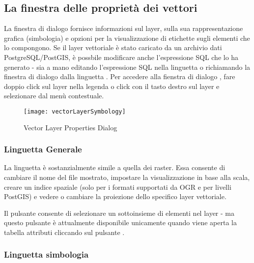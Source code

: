 \subsection{La finestra delle proprietà dei vettori}\label{sec:vectorprops}

La finestra di dialogo  fornisce informazioni
sul layer, sulla sua rappresentazione grafica (simbologia) e opzioni per la
visualizzazione di etichette sugli elementi che lo compongono. Se il layer
vettoriale è stato caricato da un archivio dati PostgreSQL/PostGIS, è possbile
modificare anche l'espressione SQL che lo ha generato - sia a mano editando
l'espressione SQL nella linguetta  o richiamando la finestra di
dialogo  dalla linguetta . 
Per accedere alla fienstra di dialogo , fare
doppio click sul layer nella legenda o click con il tasto destro  sul layer e
selezionare  dal menù contestuale.

\begin{figure}[H]
   \begin{center}
   \caption{Vector Layer Properties Dialog \nixcaption}\label{fig:vector_symbology}\smallskip
   \texttt{[image: vectorLayerSymbology]} 
\end{center}  
\end{figure}

\subsubsection{Linguetta Generale}\label{vectorgeneraltab}
La linguetta  è sostanzialmente simile a quella dei raster. Essa
consente di cambiare il nome del file mostrato, impostare la visualizzazione
in base alla scala, creare un indice spaziale (solo per i formati supportati
da OGR e per livelli PostGIS) e vedere o cambiare la proiezione dello
specifico layer vettoriale.

Il pulsante  consente di selezionare un sottoinsieme
di elementi nel layer - ma questo pulsante è attualmente disponibile
unicamente quando viene aperta la tabella attributi cliccando sul pulsante
.

\subsubsection{Linguetta simbologia}\label{sec:symbology}

